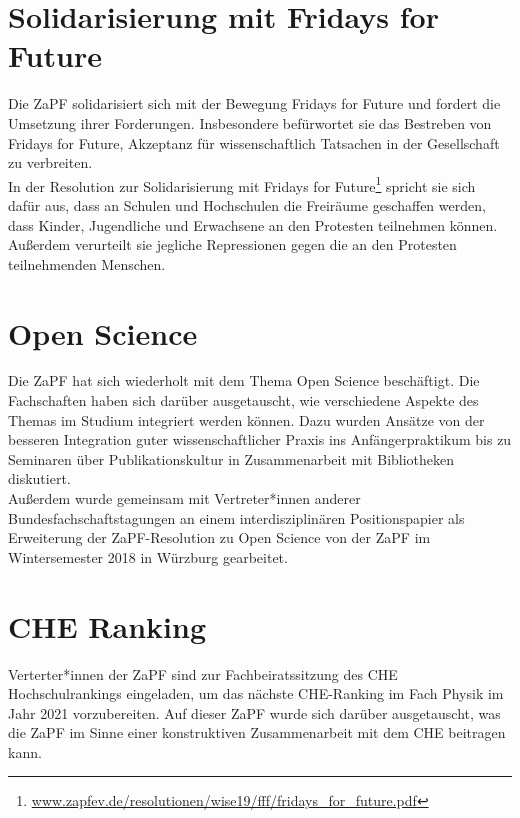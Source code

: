\section*{Solidarisierung mit Fridays for Future} 
Die ZaPF solidarisiert sich mit der Bewegung \glqq{}Fridays for Future\grqq{} und fordert die Umsetzung ihrer Forderungen. Insbesondere befürwortet sie das Bestreben von \glqq Fridays for Future\grqq{},  Akzeptanz für wissenschaftlich Tatsachen in der Gesellschaft zu verbreiten.\\
In der Resolution zur Solidarisierung mit Fridays for Future\footnote{\url{www.zapfev.de/resolutionen/wise19/fff/fridays_for_future.pdf}} spricht sie sich dafür aus, dass an Schulen und Hochschulen die Freiräume geschaffen werden, dass Kinder, Jugendliche und Erwachsene an den Protesten teilnehmen können. Außerdem verurteilt sie jegliche Repressionen gegen die an den Protesten teilnehmenden Menschen. 

\section*{Open Science}
Die ZaPF hat sich wiederholt mit dem Thema Open Science beschäftigt. Die Fachschaften haben sich darüber ausgetauscht, wie verschiedene Aspekte des Themas im Studium integriert werden können. Dazu wurden Ansätze von der besseren Integration guter wissenschaftlicher Praxis ins Anfängerpraktikum bis zu Seminaren über Publikationskultur in Zusammenarbeit mit Bibliotheken diskutiert.\\
Außerdem wurde gemeinsam mit Vertreter*innen anderer Bundesfachschaftstagungen an einem interdisziplinären  Positionspapier als Erweiterung der ZaPF-Resolution zu Open Science von der ZaPF im Wintersemester 2018 in Würzburg gearbeitet.

\section*{CHE Ranking}
Verterter*innen der ZaPF sind zur Fachbeiratssitzung des CHE Hochschulrankings eingeladen, um das nächste CHE-Ranking im Fach Physik im Jahr 2021 vorzubereiten. Auf dieser ZaPF wurde sich darüber ausgetauscht, was die ZaPF im Sinne einer konstruktiven Zusammenarbeit mit dem CHE beitragen kann.
